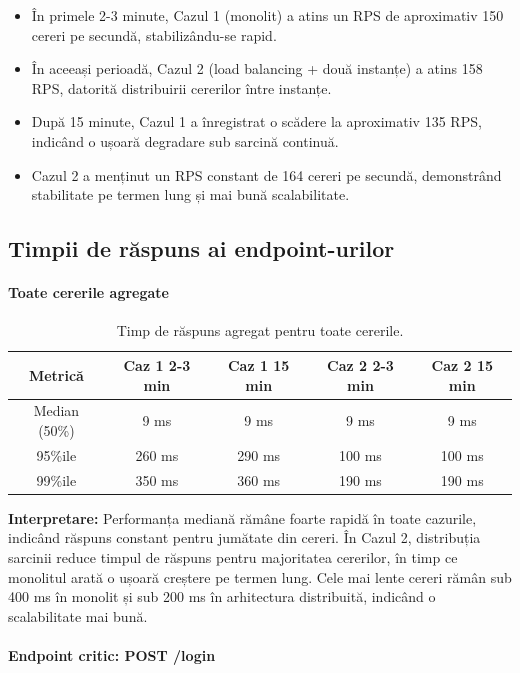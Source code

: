 \documentclass[12pt, a4paper, oneside, romanian]{teza-upb}
\begin{document}
\begin{itemize}
    \item În primele 2-3 minute, Cazul 1 (monolit) a atins un RPS de aproximativ 150 cereri pe secundă, stabilizându-se rapid.
    \item În aceeași perioadă, Cazul 2 (load balancing + două instanțe) a atins 158 RPS, datorită distribuirii cererilor între instanțe.
    \item După 15 minute, Cazul 1 a înregistrat o scădere la aproximativ 135 RPS, indicând o ușoară degradare sub sarcină continuă.
    \item Cazul 2 a menținut un RPS constant de 164 cereri pe secundă, demonstrând stabilitate pe termen lung și mai bună scalabilitate.
\end{itemize}

\subsection*{Timpii de răspuns ai endpoint-urilor}

\paragraph{Toate cererile agregate}

\begin{table}[h!]
\centering
\begin{tabular}{c|c|c|c|c}
\hline
Metrică & Caz 1 2-3 min & Caz 1 15 min & Caz 2 2-3 min & Caz 2 15 min \\
\hline
Median (50\%) & 9 ms & 9 ms & 9 ms & 9 ms \\
95\%ile & 260 ms & 290 ms & 100 ms & 100 ms \\
99\%ile & 350 ms & 360 ms & 190 ms & 190 ms \\
\hline
\end{tabular}
\caption{Timp de răspuns agregat pentru toate cererile.}
\label{tab:all-requests-comp}
\end{table}

\textbf{Interpretare:} Performanța mediană rămâne foarte rapidă în toate cazurile, indicând răspuns constant pentru jumătate din cereri. În Cazul 2, distribuția sarcinii reduce timpul de răspuns pentru majoritatea cererilor, în timp ce monolitul arată o ușoară creștere pe termen lung. Cele mai lente cereri rămân sub 400 ms în monolit și sub 200 ms în arhitectura distribuită, indicând o scalabilitate mai bună.

\paragraph{Endpoint critic: POST /login}
\end{document}
